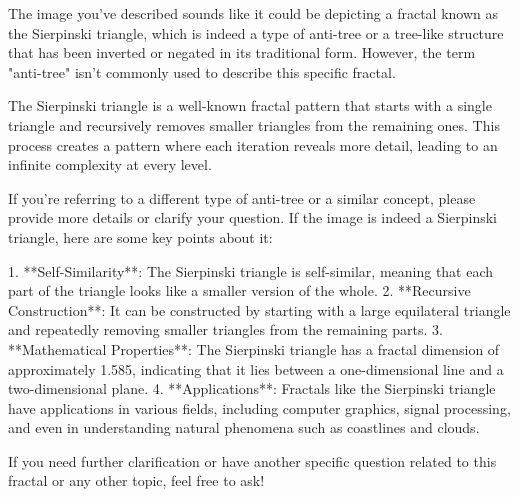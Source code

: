 The image you've described sounds like it could be depicting a fractal known as the Sierpinski triangle, which is indeed a type of anti-tree or a tree-like structure that has been inverted or negated in its traditional form. However, the term "anti-tree" isn't commonly used to describe this specific fractal.

The Sierpinski triangle is a well-known fractal pattern that starts with a single triangle and recursively removes smaller triangles from the remaining ones. This process creates a pattern where each iteration reveals more detail, leading to an infinite complexity at every level.

If you're referring to a different type of anti-tree or a similar concept, please provide more details or clarify your question. If the image is indeed a Sierpinski triangle, here are some key points about it:

1. **Self-Similarity**: The Sierpinski triangle is self-similar, meaning that each part of the triangle looks like a smaller version of the whole.
2. **Recursive Construction**: It can be constructed by starting with a large equilateral triangle and repeatedly removing smaller triangles from the remaining parts.
3. **Mathematical Properties**: The Sierpinski triangle has a fractal dimension of approximately 1.585, indicating that it lies between a one-dimensional line and a two-dimensional plane.
4. **Applications**: Fractals like the Sierpinski triangle have applications in various fields, including computer graphics, signal processing, and even in understanding natural phenomena such as coastlines and clouds.

If you need further clarification or have another specific question related to this fractal or any other topic, feel free to ask!